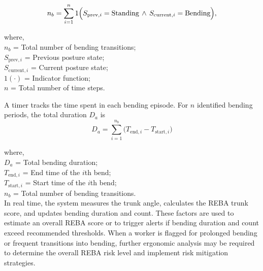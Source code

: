 \documentclass[11pt]{article}
\begin{document}
\begin{equation}
    n_b = \sum_{i=1}^{n} 
    1\Bigl(S_{\text{prev}, i} = \text{Standing} \,\land\, S_{\text{current}, i} = \text{Bending}\Bigr),
\end{equation}

\noindent where,\\
$n_b$ = Total number of bending transitions;\\
$S_{\text{prev}, i}$ = Previous posture state;\\
$S_{\text{current}, i}$ = Current posture state;\\
$1(\cdot)$ = Indicator function;\\
$n$ = Total number of time steps.

A timer tracks the time spent in each bending episode. For $n$ identified bending periods, the total duration \(D_a\) is
\begin{equation}
    D_a = \sum_{i=1}^{n_b} \bigl(T_{\text{end}, i} - T_{\text{start}, i}\bigr)
\end{equation}

\noindent where,\\
$D_a$ = Total bending duration;\\
$T_{\text{end}, i}$ = End time of the  $i$th bend; \\
$T_{\text{start}, i}$ = Start time of the $i$th bend; \\
$n_b$ = Total number of bending transitions.\\

In real time, the system measures the trunk angle, calculates the REBA trunk score, and updates bending duration and count. These factors are used to estimate an overall REBA score or to trigger alerts if bending duration and count exceed recommended thresholds. When a worker is flagged for prolonged bending or frequent transitions into bending, further ergonomic analysis may be required to determine the overall REBA risk level and implement risk mitigation strategies.
\end{document}
